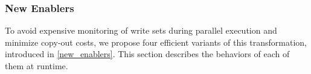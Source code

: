 

\subsubsection{New Enablers}
\label{novel_transf}

%


%

To avoid expensive monitoring of write sets during parallel execution
and minimize copy-out costs, we propose four efficient variants of
this transformation, introduced in \cref{new_enablers}. This section
describes the behaviors of each of them at runtime.
%

